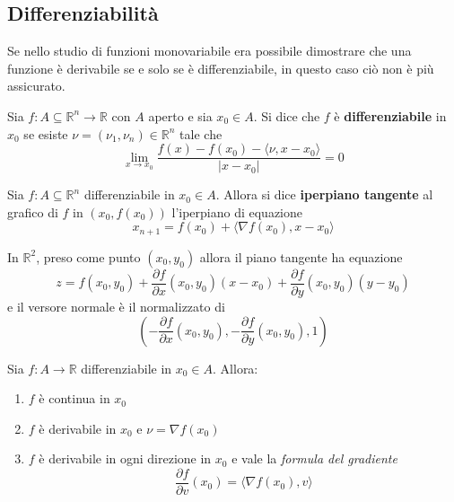 \subsection{Differenziabilità}
Se nello studio di funzioni monovariabile era possibile dimostrare che una funzione è derivabile se e solo se è differenziabile, in questo caso ciò non è più assicurato.
\begin{definition} \label{Def: Differenziabilità}
    Sia $f:A \subseteq \mathbb{R}^n \to \mathbb{R}$ con $A$ aperto e sia $x_0 \in A$. Si dice che $f$ è \textbf{differenziabile} in $x_0$ se esiste $\nu=(\nu_1, \nu_n) \in \mathbb{R}^n$ tale che
    \begin{equation}
        \lim_{x \to x_0}{\frac{f(x)-f(x_0)-\langle \nu, x-x_0\rangle}{|x-x_0|}}=0
    \end{equation}
\end{definition}
\begin{definition} {\label{Def: Piano tangente}}
    Sia $f:A \subseteq \mathbb{R}^n$ differenziabile in $x_0 \in A$. Allora si dice \textbf{iperpiano tangente} al grafico di $f$ in $(x_0, f(x_0))$ l'iperpiano di equazione
    \begin{equation}
        x_{n+1}= f(x_0)+ \langle \nabla f(x_0), x-x_0 \rangle
    \end{equation}
\end{definition}
 \begin{oss}
    In $\mathbb{R}^2$, preso come punto $(x_0, y_0)$ allora il piano tangente ha equazione
    \begin{equation}
        z=f(x_0, y_0)+ \frac{\partial f }{\partial x}{(x_0, y_0)}(x-x_0) +\frac{\partial f }{\partial y}{(x_0, y_0)}(y-y_0) 
    \end{equation}
    e il versore normale è il normalizzato di
    \begin{equation}
        \left(-\frac{\partial f}{\partial x}{(x_0, y_0)}, -\frac{\partial f}{\partial y}{(x_0, y_0)},1\right)
    \end{equation}
 \end{oss}
\begin{proposition} \label{Prop: Diff-Der-Cont}
    Sia $f:A \to \mathbb{R}$ differenziabile in $x_0 \in A$. Allora:
    \begin{enumerate}
        \item $f$ è continua in $x_0$
        \item $f$ è derivabile in $x_0$ e $\nu=\nabla f(x_0)$
        \item $f$ è derivabile in ogni direzione in $x_0$ e vale la \textit{formula del gradiente}
            \begin{equation} \label{Eq:Formula gradiente}
                \frac{\partial{f}}{\partial{v}}(x_0)= \langle \nabla f(x_0), v\rangle
            \end{equation}
    \end{enumerate}
\end{proposition}
